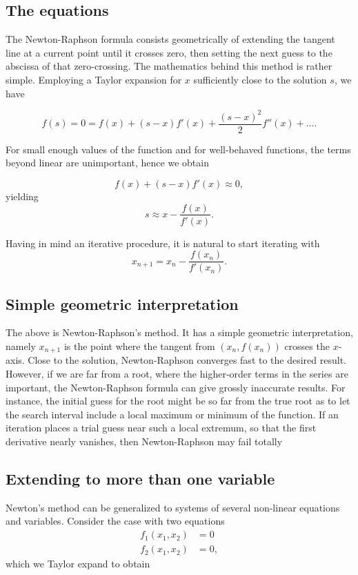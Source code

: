 \documentclass[%
oneside,                 %
final,                   %
10pt]{article}
\begin{document}
\subsection*{The equations}

The Newton-Raphson formula consists geometrically of extending the
tangent line at a current point until it crosses zero, then setting
the next guess to the abscissa of that zero-crossing.  The mathematics
behind this method is rather simple. Employing a Taylor expansion for
$x$ sufficiently close to the solution $s$, we have


\[
    f(s)=0=f(x)+(s-x)f'(x)+\frac{(s-x)^2}{2}f''(x) +\dots.
    \label{eq:taylornr}
\]

For small enough values of the function and for well-behaved
functions, the terms beyond linear are unimportant, hence we obtain


\[
   f(x)+(s-x)f'(x)\approx 0,
\]
yielding
\[
   s\approx x-\frac{f(x)}{f'(x)}.
\]

Having in mind an iterative procedure, it is natural to start iterating with
\[
   x_{n+1}=x_n-\frac{f(x_n)}{f'(x_n)}.
\]

\subsection*{Simple geometric interpretation}

The above is Newton-Raphson's method. It has a simple geometric
interpretation, namely $x_{n+1}$ is the point where the tangent from
$(x_n,f(x_n))$ crosses the $x$-axis.  Close to the solution,
Newton-Raphson converges fast to the desired result. However, if we
are far from a root, where the higher-order terms in the series are
important, the Newton-Raphson formula can give grossly inaccurate
results. For instance, the initial guess for the root might be so far
from the true root as to let the search interval include a local
maximum or minimum of the function.  If an iteration places a trial
guess near such a local extremum, so that the first derivative nearly
vanishes, then Newton-Raphson may fail totally


\subsection*{Extending to more than one variable}

Newton's method can be generalized to systems of several non-linear equations
and variables. Consider the case with two equations
\[
   \begin{array}{cc} f_1(x_1,x_2) &=0\\
                     f_2(x_1,x_2) &=0,\end{array}
\]
which we Taylor expand to obtain
\end{document}
